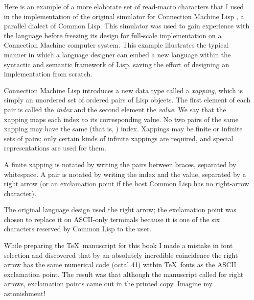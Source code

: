 \begin{defun}[Function]
\begin{new}
Here is an example of a more elaborate set of read-macro characters
that I used in the implementation of the original
simulator for Connection Machine Lisp
\cite{CONNECTION-MACHINE-LISP,CMLISP-IMPLEMENTATION},
a parallel dialect of Common Lisp.  This simulator was used to gain experience with
the language before freezing its design for full-scale implementation on a
Connection Machine computer system.  This example illustrates the typical manner
in which a language designer can embed a new language within the syntactic and
semantic framework of Lisp, saving the effort of designing an implementation
from scratch.

Connection Machine Lisp introduces a new data type called a \emph{xapping},
which is simply an unordered set of ordered pairs of Lisp objects.
The first element of each pair is called the \emph{index} and the second element
the \emph{value}.  We say that the xapping maps each index to its corresponding value.
No two pairs of the same xapping may have the same (that is, ) index.
Xappings may be finite or infinite sets of pairs; only certain kinds
of infinite xappings are required, and special representations are used for them.

A finite xapping is notated by writing the pairs between braces, separated by whitespace.
A pair is notated by writing the index and the value, separated by a right arrow
(or an exclamation point if the host Common Lisp has no right-arrow character).

\beforenoterule
\begin{sideremark}
The original language design used the right arrow; the exclamation point was
chosen to replace it on {ASCII}-only terminals because it is one of
the six characters  reserved by Common Lisp to the user.

While preparing the \TeX\ manuscript for this book I made a mistake
in font selection and discovered that by an absolutely incredible coincidence
the right arrow has the same numerical code (octal 41) within \TeX\ fonts
as the {ASCII} exclamation point.
The result was that although the manuscript called for right arrows,
exclamation points came out in the printed copy.  Imagine my astonishment!
\end{sideremark}
\afternoterule


\end{new}
\end{defun}
